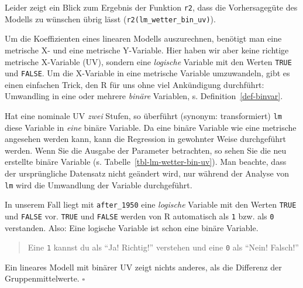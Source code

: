 \documentclass[
  letterpaper,
  twoside,
  open=any]{scrbook}
\theoremstyle{definition}
\theoremstyle{definition}
\theoremstyle{definition}
\theoremstyle{remark}
\begin{document}
Leider zeigt ein Blick zum Ergebnis der Funktion \texttt{r2}, dass die
Vorhersagegüte des Modells zu wünschen übrig lässt
(\texttt{r2(lm\_wetter\_bin\_uv)}).

Um die Koeffizienten eines linearen Modells auszurechnen, benötigt man
eine metrische X- und eine metrische Y-Variable. Hier haben wir aber
keine richtige metrische X-Variable (UV), sondern eine \emph{logische}
Variable mit den Werten \texttt{TRUE} und \texttt{FALSE}. Um die
X-Variable in eine metrische Variable umzuwandeln, gibt es einen
einfachen Trick, den R für uns ohne viel Ankündigung durchführt:
Umwandling in eine oder mehrere \emph{binäre} Variablen, s.
Definition~\ref{def-binvar}.

Hat eine nominale UV \emph{zwei} Stufen, so überführt (synonym:
transformiert) \texttt{lm} diese Variable in \emph{eine} binäre
Variable. Da eine binäre Variable wie eine metrische angesehen werden
kann, kann die Regression in gewohnter Weise durchgeführt werden. Wenn
Sie die Ausgabe der Parameter betrachten, so sehen Sie die neu erstellte
binäre Variable (s. Tabelle~\ref{tbl-lm-wetter-bin-uv}). Man beachte,
dass der ursprüngliche Datensatz nicht geändert wird, nur während der
Analyse von \texttt{lm} wird die Umwandlung der Variable durchgeführt.

In unserem Fall liegt mit \texttt{after\_1950} eine \emph{logische}
Variable mit den Werten \texttt{TRUE} und \texttt{FALSE} vor.
\texttt{TRUE} und \texttt{FALSE} werden von R automatisch als \texttt{1}
bzw. als \texttt{0} verstanden. Also: Eine logische Variable ist schon
eine binäre Variable.

\begin{quote}
{} Eine \texttt{1} kannst du als \enquote{Ja! Richtig!}
verstehen und eine \texttt{0} als \enquote{Nein! Falsch!}
\end{quote}

\begin{tcolorbox}[enhanced jigsaw, colbacktitle=quarto-callout-important-color!10!white, colframe=quarto-callout-important-color-frame, coltitle=black, arc=.35mm, breakable, opacitybacktitle=0.6, toprule=.15mm, colback=white, rightrule=.15mm, opacityback=0, toptitle=1mm, title=\textcolor{quarto-callout-important-color}{\faExclamation}\hspace{0.5em}{Wichtig}, titlerule=0mm, bottomtitle=1mm, bottomrule=.15mm, leftrule=.75mm, left=2mm]

Ein lineares Modell mit binärer UV zeigt nichts anderes, als die
Differenz der Gruppenmittelwerte. \(\square\)

\end{tcolorbox}
\end{document}

